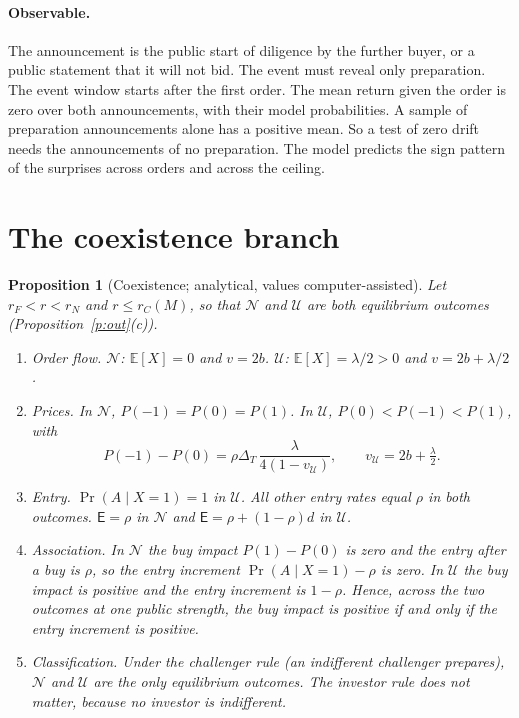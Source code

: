\documentclass[12pt]{article}
\newtheorem{proposition}{Proposition}
\theoremstyle{definition}
\newcommand{\E}{\mathbb E}
\newcommand{\Ent}{\mathsf E}
\begin{document}
\paragraph{Observable.}
The announcement is the public start of diligence by the further buyer, or a public statement that it will not bid.
The event must reveal only preparation.
The event window starts after the first order.
The mean return given the order is zero over both announcements, with their model probabilities.
A sample of preparation announcements alone has a positive mean.
So a test of zero drift needs the announcements of no preparation.
The model predicts the sign pattern of the surprises across orders and across the ceiling.

\section{The coexistence branch}\label{sec:coex}

\begin{proposition}[Coexistence; analytical, values computer-assisted]\label{p:coex}
Let $r_F<r<r_N$ and $r\le r_C(M)$, so that $\mathcal N$ and $\mathcal U$ are both equilibrium outcomes (Proposition~\ref{p:out}(c)).
\begin{enumerate}[label=(\roman*)]
\item \emph{Order flow.} $\mathcal N$: $\E[X]=0$ and $v=2b$. $\mathcal U$: $\E[X]=\lambda/2>0$ and $v=2b+\lambda/2$.
\item \emph{Prices.} In $\mathcal N$, $P(-1)=P(0)=P(1)$. In $\mathcal U$, $P(0)<P(-1)<P(1)$, with
\[
P(-1)-P(0)=\rho\Delta_T\,\frac{\lambda}{4(1-v_{\mathcal U})},\qquad v_{\mathcal U}=2b+\tfrac\lambda2 .
\]
\item \emph{Entry.} $\Pr(A\mid X=1)=1$ in $\mathcal U$. All other entry rates equal $\rho$ in both outcomes. $\Ent=\rho$ in $\mathcal N$ and $\Ent=\rho+(1-\rho)d$ in $\mathcal U$.
\item \emph{Association.} In $\mathcal N$ the buy impact $P(1)-P(0)$ is zero and the entry after a buy is $\rho$, so the entry increment $\Pr(A\mid X=1)-\rho$ is zero. In $\mathcal U$ the buy impact is positive and the entry increment is $1-\rho$. Hence, across the two outcomes at one public strength, the buy impact is positive if and only if the entry increment is positive.
\item \emph{Classification.} Under the challenger rule (an indifferent challenger prepares), $\mathcal N$ and $\mathcal U$ are the only equilibrium outcomes. The investor rule does not matter, because no investor is indifferent.
\end{enumerate}
\end{proposition}
\end{document}
